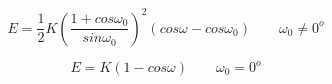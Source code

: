 


$$
E=\frac{1}{2}K\left( \frac{1+cos\omega_0}{sin\omega_0}\right) ^2 \left( cos\omega - cos\omega_0\right) \qquad \omega_0 \neq 0^o
$$

$$
E=K\left( 1-cos\omega\right)  \qquad \omega_0 = 0^o
$$


